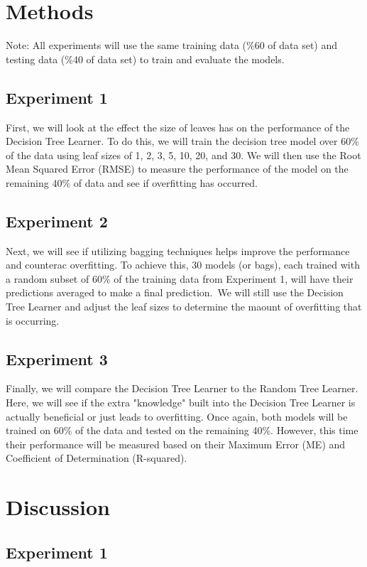 \documentclass[
	letterpaper, %
]{jdf}
\begin{document}
\section{Methods}

Note: All experiments will use the same training data (\%60 of data set) and testing data (\%40 of data set) to train and evaluate the models.
\subsection{Experiment 1}
First, we will look at the effect the size of leaves has on the performance of the Decision Tree Learner.
To do this, we will train the decision tree model over 60\% of the data using leaf sizes of 1, 2, 3, 5, 10, 20, and 30.
We will then use the Root Mean Squared Error (RMSE) to measure the performance of the model on the remaining 40\% of data and see if overfitting has occurred.

\subsection{Experiment 2}
Next, we will see if utilizing bagging techniques helps improve the performance and counterac overfitting.
To achieve this, 30 models (or bags), each trained with a random subset of 60\% of the training data from Experiment 1, will have their predictions averaged to make a final prediction.\
We will still use the Decision Tree Learner and adjust the leaf sizes to determine the maount of overfitting that is occurring.

\subsection{Experiment 3}
Finally, we will compare the Decision Tree Learner to the Random Tree Learner.
Here, we will see if the extra "knowledge" built into the Decision Tree Learner is actually beneficial or just leads to overfitting.
Once again, both models will be trained on 60\% of the data and tested on the remaining 40\%.
However, this time their performance will be measured based on their Maximum Error (ME) and Coefficient of Determination (R-squared). %


\section{Discussion}

\subsection{Experiment 1}
\end{document}
